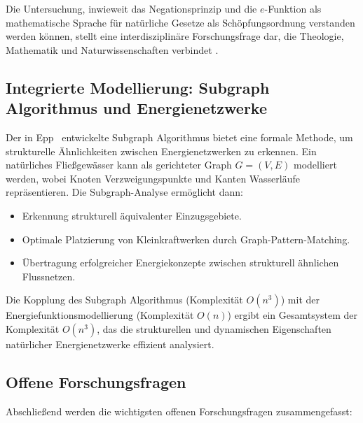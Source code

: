 ﻿\documentclass[a4paper,12pt]{article}
\theoremstyle{definition}
\begin{document}
Die Untersuchung, inwieweit das Negationsprinzip und die $e$-Funktion als
mathematische Sprache f\"ur nat\"urliche Gesetze als Sch\"opfungsordnung verstanden
werden k\"onnen, stellt eine interdisziplin\"are Forschungsfrage dar, die Theologie,
Mathematik und Naturwissenschaften verbindet \cite{Polkinghorne1998}.

\subsection{Integrierte Modellierung: Subgraph Algorithmus und Energienetzwerke}

Der in Epp~\cite{Epp2026Subgraph} entwickelte Subgraph Algorithmus bietet eine
formale Methode, um strukturelle \"Ahnlichkeiten zwischen Energienetzwerken zu
erkennen. Ein nat\"urliches Flie\ss{}gew\"asser kann als gerichteter Graph $G = (V, E)$
modelliert werden, wobei Knoten Verzweigungspunkte und Kanten Wasserl\"aufe
repr\"asentieren. Die Subgraph-Analyse erm\"oglicht dann:

\begin{itemize}
    \item Erkennung strukturell \"aquivalenter Einzugsgebiete.
    \item Optimale Platzierung von Kleinkraftwerken durch Graph-Pattern-Matching.
    \item \"Ubertragung erfolgreicher Energiekonzepte zwischen strukturell
          \"ahnlichen Flussnetzen.
\end{itemize}

Die Kopplung des Subgraph Algorithmus (Komplexit\"at $O(n^3)$) mit der
Energiefunktionsmodellierung (Komplexit\"at $O(n)$) ergibt ein Gesamtsystem der
Komplexit\"at $O(n^3)$, das die strukturellen und dynamischen Eigenschaften
nat\"urlicher Energienetzwerke effizient analysiert.

\subsection{Offene Forschungsfragen}

Abschlie\ss{}end werden die wichtigsten offenen Forschungsfragen zusammengefasst:
\end{document}
